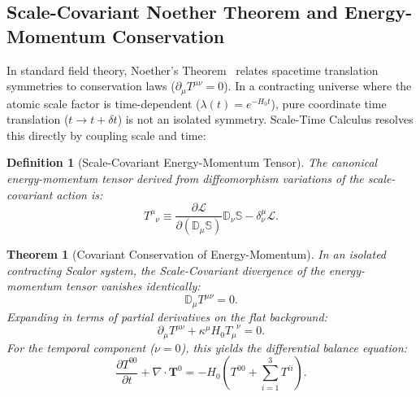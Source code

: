 \documentclass[11pt,a4paper]{article}
\newtheorem{theorem}{Theorem}[section]
\newtheorem{definition}{Definition}[section]
\begin{document}
\subsection{Scale-Covariant Noether Theorem and Energy-Momentum Conservation}
\label{sec:noether_ve_enerji}

In standard field theory, Noether's Theorem~\cite{noether1918} relates spacetime translation symmetries to conservation laws ($\partial_\mu T^{\mu\nu} = 0$). In a contracting universe where the atomic scale factor is time-dependent ($\lambda(t) = e^{-H_0 t}$), pure coordinate time translation ($t \to t + \delta t$) is not an isolated symmetry. Scale-Time Calculus resolves this directly by coupling scale and time:

\begin{definition}[Scale-Covariant Energy-Momentum Tensor]
    \label{def:olcek_enerji_momentum_tensoru_sc}
    The canonical energy-momentum tensor derived from diffeomorphism variations of the scale-covariant action is:
    \begin{equation}
        T^\mu_{\phantom{\mu}\nu} \equiv \frac{\partial \mathcal{L}}{\partial (\mathbb{D}_\mu \mathbb{S})} \mathbb{D}_\nu \mathbb{S} - \delta^\mu_\nu \mathcal{L}.
        \label{eq:olcek_enerji_momentum_tensoru}
    \end{equation}
\end{definition}

\begin{theorem}[Covariant Conservation of Energy-Momentum]
    \label{thm:kovaryant_korunum_sc}
    In an isolated contracting Scalor system, the Scale-Covariant divergence of the energy-momentum tensor vanishes identically:
    \begin{equation}
        \mathbb{D}_\mu T^{\mu\nu} = 0.
        \label{eq:kovaryant_korunum}
    \end{equation}
    Expanding in terms of partial derivatives on the flat background:
    \begin{equation}
        \partial_\mu T^{\mu\nu} + \kappa^\mu H_0 T_{\mu}^{\phantom{\mu}\nu} = 0.
    \end{equation}
    For the temporal component ($\nu = 0$), this yields the differential balance equation:
    \begin{equation}
        \frac{\partial T^{00}}{\partial t} + \nabla \cdot \mathbf{T}^{0} = - H_0 \left( T^{00} + \sum_{i=1}^3 T^{ii} \right).
        \label{eq:enerji_bilancosu}
    \end{equation}
\end{theorem}
\end{document}
